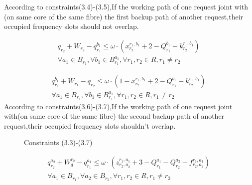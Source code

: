 \documentclass[a4paper,11pt]{report}
\begin{document}
\begin{itemize}
    According to constraints(3.4)-(3.5),If the working path of one request joint with (on same core of the same fibre) the first backup path of another request,their occupied frequency slots should not overlap.
    
    \begin{equation}
    \begin{split}
        &q^{}_{r_2}+W^{}_{r_2}-q^{b_1}_{r_1} \leq\omega\cdot(x^{r_1,b_1}_{r_2}+2-Q^{b_1}_{r_1}-k^{r_1,b_1}_{r_2})
        \quad\\
        &\forall{a_1\in B^{}_{r_1}},\forall{b_1\in B^{a_1}_{r_1}},\forall{r_1,r_2\in R,r_1\neq r_2} 
        \label{ilp-st}
    \end{split}
    \end{equation}

    \begin{equation}
    \begin{split}
        &q^{b_1}_{r_1}+W^{}_{r_1}-q^{}_{r_2} \leq\omega\cdot(1-x^{r_1,b_1}_{r_2}+2-Q^{b_1}_{r_1}-k^{r_1,b_1}_{r_2}) 
        \quad\\
        &\forall{a_1\in B^{}_{r_1}},\forall{b_1\in B^{a_1}_{r_1}},\forall{r_1,r_2\in R,r_1\neq r_2} \label{ilp-st}
    \end{split}
    \end{equation}
    According to constraints(3.6)-(3.7),If the working path of one request joint with(on same core of the same fibre) the second backup path of another request,their occupied frequency slots shouldn’t overlap.
    
    \begin{figure}[htbp]
        \begin{center}
        \end{center}
        \caption{Constraints (3.3)-(3.7)}
        \label{figure:Constraints (3.3)-(3.7)}
        \end{figure}
    
    \begin{equation}
    \begin{split}
        &q^{a_2}_{r_2}+W^{r_2}_d-q^{a_1}_{r_1} \leq\omega\cdot(z^{r_1,a^{}_1}_{r_2,a^{}_2}+3-Q^{a_1}_{r_1}-Q^{a_2}_{r_2}-f^{r_1,a_1}_{r_2,a_2}) \quad\\
        &\forall{a^{}_1\in B^{}_{r_1}},\forall{a^{}_2\in B^{}_{r_2}},\forall{r_1,r_2\in R,r_1\neq r_2} \label{ilp-st}
    \end{split}
    \end{equation}


\end{itemize}
\end{document}
